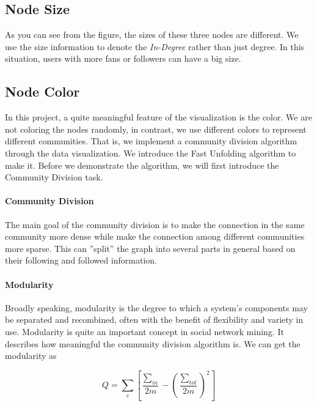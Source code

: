 \documentclass[11pt,a4paper]{article}
\begin{document}
\hypertarget{header-n13}{%
\subsection{Node Size}\label{header-n13}}

As you can see from the figure, the sizes of these three nodes are
different. We use the size information to denote the \emph{In-Degree}
rather than just degree. In this situation, users with more fans or
followers can have a big size.

\hypertarget{header-n16}{%
\subsection{Node Color}\label{header-n16}}

In this project, a quite meaningful feature of the visualization is the
color. We are not coloring the nodes randomly, in contrast, we use
different colors to represent different communities. That is, we
implement a community division algorithm through the data visualization.
We introduce the Fast Unfolding algorithm to make it. Before we
demonstrate the algorithm, we will first introduce the Community
Division task.

\hypertarget{header-n19}{%
\paragraph{Community Division}\label{header-n19}}

The main goal of the community division is to make the connection in the same community more dense while make the connection among different communities more sparse. This can ''split'' the graph into several parts in general based on their following and followed information.

\hypertarget{header-n22}{%
\paragraph{Modularity}\label{header-n22}}

Broadly speaking, modularity is the degree to which a system's
components may be separated and recombined, often with the benefit of
flexibility and variety in use. Modularity is quite an important concept
in social network mining. It describes how meaningful the community
division algorithm is. We can get the modularity as

\[Q=\sum_c[\frac{\sum_{in}}{2m}−(\frac{\sum_{tot}}{2m})^2]\]
\end{document}

